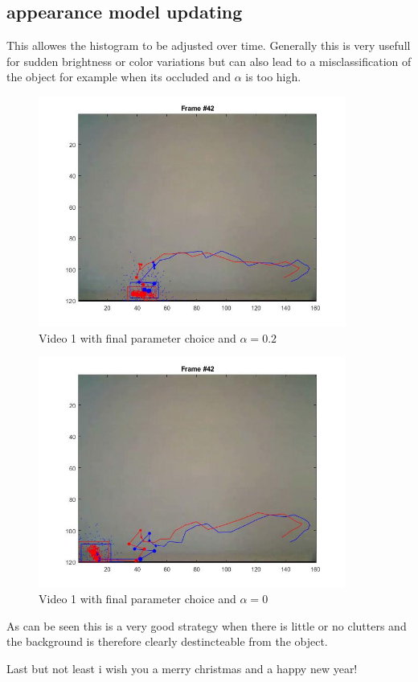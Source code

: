 \documentclass[12pt]{article}
\begin{document}
\subsection{appearance model updating}
This allowes the histogram to be adjusted over time. Generally this is very usefull for sudden brightness or color variations but can also lead to a misclassification of the object for example when its occluded and $\alpha$ is too high. 
\begin{figure}[H]
	\centering
	\includegraphics[width=0.9\textwidth]{vid1_2.jpg}
	\caption{Video 1 with final parameter choice and $\alpha = 0.2$}
	\label{fig1}
\end{figure}
\begin{figure}[H]
	\centering
	\includegraphics[width=0.9\textwidth]{vid_1_3.jpg}
	\caption{Video 1 with final parameter choice and $\alpha = 0$}
	\label{fig1}
\end{figure}
As can be seen this is a very good strategy when there is little or no clutters and the background is therefore clearly destincteable from the object.
\vspace{5mm}
\newline

Last but not least i wish you a merry christmas and a happy new year! 
\end{document}
